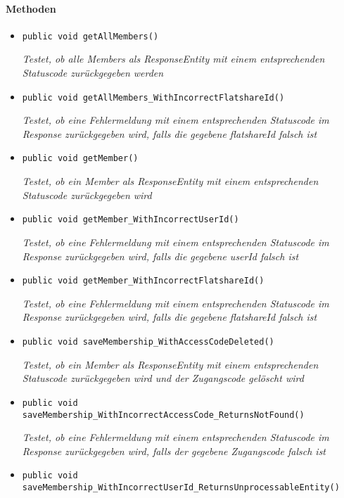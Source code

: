  \paragraph*{Methoden}
 \begin{itemize}
 	\item{\texttt{public void getAllMembers()}}
 	
 	\textit{Testet, ob alle Members als ResponseEntity mit einem entsprechenden Statuscode zurückgegeben werden}
 	
 	\item{\texttt{public void getAllMembers\_WithIncorrectFlatshareId()}}
 	
 	\textit{Testet, ob eine Fehlermeldung mit einem entsprechenden Statuscode im Response zurückgegeben wird, falls die gegebene flatshareId falsch ist}
 	
 	\item{\texttt{public void getMember()}}
 	
 	\textit{Testet, ob ein Member als ResponseEntity mit einem entsprechenden Statuscode zurückgegeben wird}
 	
 	\item{\texttt{public void getMember\_WithIncorrectUserId()}}
 	
 	\textit{Testet, ob eine Fehlermeldung mit einem entsprechenden Statuscode im Response zurückgegeben wird, falls die gegebene userId falsch ist}
 	
 	\item{\texttt{public void getMember\_WithIncorrectFlatshareId()}}
 	
 	\textit{Testet, ob eine Fehlermeldung mit einem entsprechenden Statuscode im Response zurückgegeben wird, falls die gegebene flatshareId falsch ist}
 	
 	\item{\texttt{public void saveMembership\_WithAccessCodeDeleted()}}
 	
 	\textit{Testet, ob ein Member als ResponseEntity mit einem entsprechenden Statuscode zurückgegeben wird und der Zugangscode gelöscht wird}
 	
 	\item{\texttt{public void saveMembership\_WithIncorrectAccessCode\_ReturnsNotFound()}}
 	
 	\textit{Testet, ob eine Fehlermeldung mit einem entsprechenden Statuscode im Response zurückgegeben wird, falls der gegebene Zugangscode falsch ist}
 	
 	\item{\texttt{public void saveMembership\_WithIncorrectUserId\_Returns\-UnprocessableEntity()}}
 	

\end{itemize}
